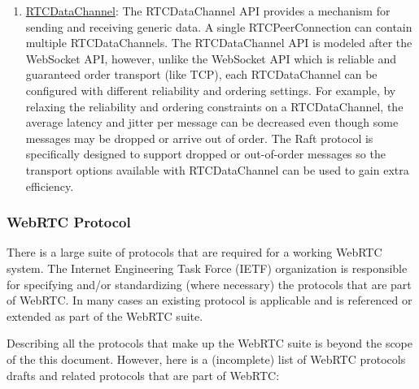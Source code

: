 \documentclass[9pt]{extarticle}
\begin{document}
\begin{multicols}{2}
\begin{enumerate}
\item \href{http://www.w3.org/TR/webrtc/\#rtcdatachannel}{RTCDataChannel}: The RTCDataChannel API provides a mechanism for sending and receiving generic data. A single RTCPeerConnection can contain multiple RTCDataChannels. The RTCDataChannel API is modeled after the WebSocket API, however, unlike the WebSocket API which is reliable and guaranteed order transport (like TCP), each RTCDataChannel can be configured with different reliability and ordering settings. For example, by relaxing the reliability and ordering constraints on a RTCDataChannel, the average latency and jitter per message can be decreased even though some messages may be dropped or arrive out of order. The Raft protocol is specifically designed to support dropped or out-of-order messages so the transport options available with RTCDataChannel can be used to gain extra efficiency.
\end{enumerate}


\subsubsection{WebRTC Protocol}

There is a large suite of protocols that are required for a working
WebRTC system. The Internet Engineering Task Force (IETF) organization
is responsible for specifying and/or standardizing (where necessary)
the protocols that are part of WebRTC. In many cases an existing
protocol is applicable and is referenced or extended as part of the
WebRTC suite.

Describing all the protocols that make up the WebRTC suite is beyond
the scope of the this document. However, here is a (incomplete) list
of WebRTC protocols drafts and related protocols that are
part of WebRTC:


\end{multicols}
\end{document}
